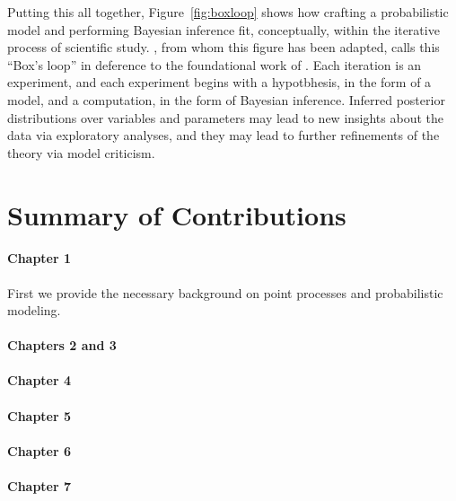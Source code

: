 Putting this all together, 
Figure~\ref{fig:boxloop} shows how crafting a probabilistic model and
performing Bayesian inference fit, conceptually, within the iterative
process of scientific study. \citet{blei2014build}, from whom this
figure has been adapted, calls this ``Box's loop'' in deference to the
foundational work of \citet{box1980sampling}. Each iteration is an 
experiment, and each experiment begins with a hypotbhesis, in the 
form of a model, and a computation, in the form of Bayesian inference.
Inferred posterior distributions over variables and parameters may 
lead to new insights about the data via exploratory analyses, and 
they may lead to further refinements of the theory via model criticism.







\section{Summary of Contributions}

\paragraph{Chapter 1} First we provide the necessary background on point processes and probabilistic modeling.

\paragraph{Chapters 2 and 3}

\paragraph{Chapter 4}

\paragraph{Chapter 5}

\paragraph{Chapter 6}

\paragraph{Chapter 7}
